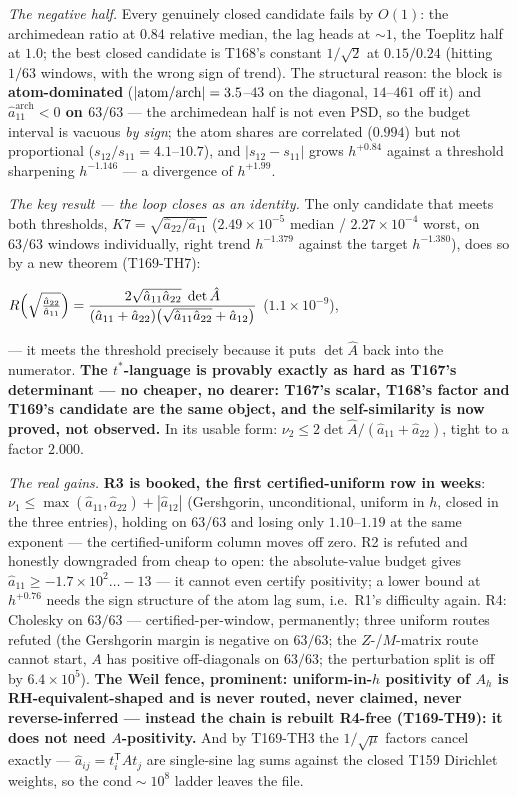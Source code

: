 \documentclass[11pt,a4paper]{article}
\begin{document}
\emph{The negative half.} Every genuinely closed candidate fails by $O(1)$:
the archimedean ratio at $0.84$ relative median, the lag heads at ${\sim}1$,
the Toeplitz half at $1.0$; the best closed candidate is T168's constant
$1/\sqrt2$ at $0.15/0.24$ (hitting $1/63$ windows, with the wrong sign of
trend). The structural reason: the block is \textbf{atom-dominated}
($|{\rm atom/arch}|=3.5$--$43$ on the diagonal, $14$--$461$ off it) and
\textbf{$\hat a_{11}^{\mathrm{arch}}<0$ on $63/63$} --- the archimedean half
is not even PSD, so the budget interval is vacuous \emph{by sign}; the atom
shares are correlated ($0.994$) but not proportional
($s_{12}/s_{11}=4.1$--$10.7$), and $|s_{12}-s_{11}|$ grows $h^{+0.84}$
against a threshold sharpening $h^{-1.146}$ --- a divergence of
$h^{+1.99}$.

\emph{The key result --- the loop closes as an identity.} The only
candidate that meets both thresholds, $K7=\sqrt{\hat a_{22}/\hat a_{11}}$
($2.49\times10^{-5}$ median / $2.27\times10^{-4}$ worst, on $63/63$ windows
individually, right trend $h^{-1.379}$ against the target $h^{-1.380}$),
does so by a new theorem (T169-TH7):
\begin{keyeq}$\displaystyle
R\Bigl(\sqrt{\tfrac{\hat a_{22}}{\hat a_{11}}}\Bigr)
=\frac{2\sqrt{\hat a_{11}\hat a_{22}}\;\det\hat A}
{(\hat a_{11}+\hat a_{22})\bigl(\sqrt{\hat a_{11}\hat a_{22}}+\hat a_{12}\bigr)}$
\quad($1.1\times10^{-9}$),
\end{keyeq}
\noindent --- it meets the threshold precisely because it puts $\det\hat A$
back into the numerator. \textbf{The $t^*$-language is provably exactly as
hard as T167's determinant --- no cheaper, no dearer: T167's scalar, T168's
factor and T169's candidate are the same object, and the self-similarity is
now proved, not observed.} In its usable form: $\nu_2\le2\det\hat A/(\hat
a_{11}+\hat a_{22})$, tight to a factor $2.000$.

\emph{The real gains.} \textbf{R3 is booked, the first certified-uniform
row in weeks}: $\nu_1\le\max(\hat a_{11},\hat a_{22})+|\hat a_{12}|$
(Gershgorin, unconditional, uniform in $h$, closed in the three entries),
holding on $63/63$ and losing only $1.10$--$1.19$ at the same exponent ---
the certified-uniform column moves off zero. R2 is refuted and honestly
downgraded from cheap to open: the absolute-value budget gives $\hat
a_{11}\ge-1.7\times10^{2}\ldots-13$ --- it cannot even certify positivity;
a lower bound at $h^{+0.76}$ needs the sign structure of the atom lag sum,
i.e.\ R1's difficulty again. R4: Cholesky on $63/63$ ---
certified-per-window, permanently; three uniform routes refuted (the
Gershgorin margin is negative on $63/63$; the $Z$-/$M$-matrix route cannot
start, $A$ has positive off-diagonals on $63/63$; the perturbation split is
off by $6.4\times10^{5}$). \textbf{The Weil fence, prominent:
uniform-in-$h$ positivity of $A_h$ is RH-equivalent-shaped and is never
routed, never claimed, never reverse-inferred --- instead the chain is
rebuilt R4-free (T169-TH9): it does not need $A$-positivity.} And by
T169-TH3 the $1/\sqrt{\mu}$ factors cancel exactly --- $\hat a_{ij}=
t_i^{\mathsf T}At_j$ are single-sine lag sums against the closed T159
Dirichlet weights, so the $\mathrm{cond}\sim10^{8}$ ladder leaves the file.
\end{document}
